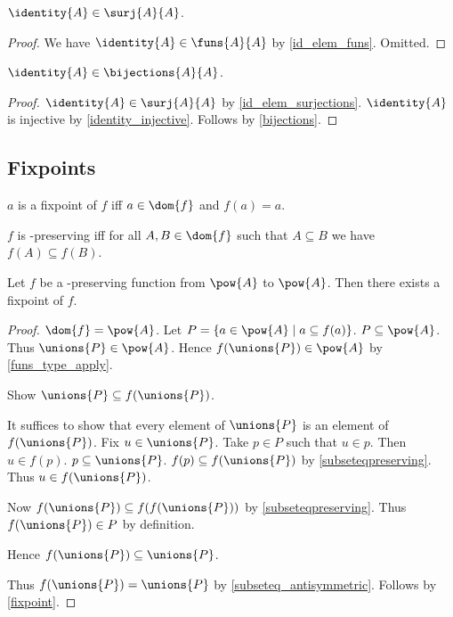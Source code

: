 \begin{proposition}\label{id_elem_surjections}
    $\identity{A}\in\surj{A}{A}$.
\end{proposition}
\begin{proof}
    We have $\identity{A}\in\funs{A}{A}$ by \cref{id_elem_funs}.
    Omitted. %
\end{proof}

\begin{proposition}\label{id_elem_bijections}
    $\identity{A}\in\bijections{A}{A}$.
\end{proposition}
\begin{proof}
    $\identity{A}\in\surj{A}{A}$ by \cref{id_elem_surjections}.
    $\identity{A}$ is injective by \cref{identity_injective}.
    Follows by \cref{bijections}.
\end{proof}
\subsection{Fixpoints}

\begin{definition}\label{fixpoint}
    $a$ is a fixpoint of $f$ iff $a\in\dom{f}$ and $f(a) = a$.
\end{definition}

\begin{definition}\label{subseteqpreserving}
    $f$ is \subseteq-preserving iff
    for all $A, B\in\dom{f}$ such that $A\subseteq B$ we have $f(A)\subseteq f(B)$.
\end{definition}

\begin{theorem}\label{knastertarski}
    Let $f$ be a \subseteq-preserving function from $\pow{A}$ to $\pow{A}$.
    Then there exists a fixpoint of $f$.
\end{theorem}
\begin{proof}
    $\dom{f} = \pow{A}$.
    Let $P = \{a\in\pow{A}\mid a\subseteq f(a)\}$.
    $P\subseteq\pow{A}$.
    Thus $\unions{P}\in\pow{A}$.
    Hence $f(\unions{P})\in\pow{A}$ by \cref{funs_type_apply}.

    Show $\unions{P}\subseteq f(\unions{P})$.
    \begin{subproof}
        It suffices to show that every element of $\unions{P}$ is an element of $f(\unions{P})$.
        Fix $u\in\unions{P}$.
        Take $p\in P$ such that $u\in p$.
        Then $u\in f(p)$.
        $p\subseteq\unions{P}$.
        $f(p)\subseteq f(\unions{P})$ by \cref{subseteqpreserving}.
        Thus $u\in f(\unions{P})$.
    \end{subproof}

    Now $f(\unions{P})\subseteq f(f(\unions{P}))$ by \cref{subseteqpreserving}.
    Thus $f(\unions{P})\in P$ by definition.

    Hence $f(\unions{P})\subseteq \unions{P}$.

    Thus $f(\unions{P}) = \unions{P}$ by \cref{subseteq_antisymmetric}.
    Follows by \cref{fixpoint}.
\end{proof}
